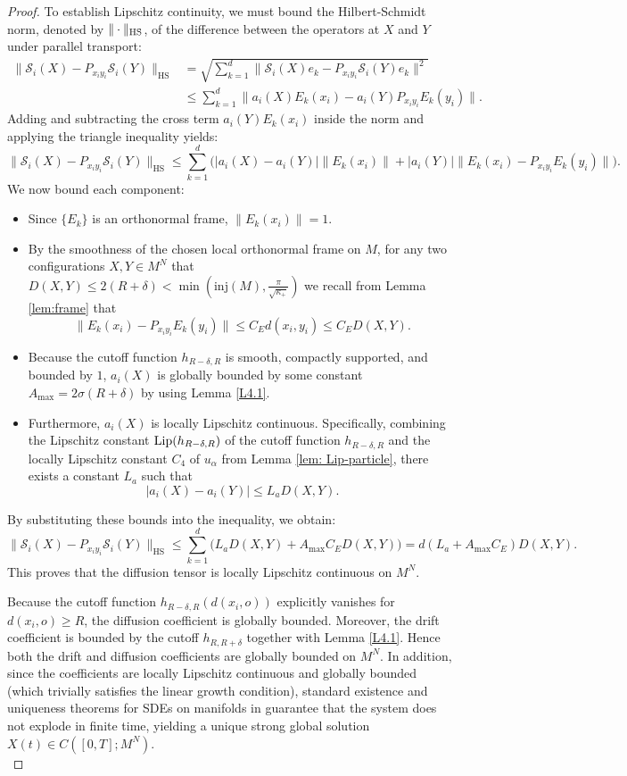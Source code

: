 \documentclass[11pt]{amsart}
\newcommand{\p}{o}%
\newcommand{\dist}{d}%
\begin{document}
\begin{proof}
To establish Lipschitz continuity, we must bound the Hilbert-Schmidt norm, denoted by $\|\cdot\|_{\textup{HS}}$, of the difference between the operators at $X$ and $Y$ under parallel transport:
\begin{align*}
\|\mathcal{S}_i(X) - P_{x_i y_i}\mathcal{S}_i(Y)\|_{\mathrm{HS}} & = \sqrt{ \sum_{k=1}^d \| \mathcal{S}_i(X)e_k - P_{x_i y_i}\mathcal{S}_i(Y)e_k \|^2 } \\
&\leq \sum_{k=1}^d \|a_i(X)E_k(x_i) - a_i(Y)P_{x_i y_i}E_k(y_i)\|.
\end{align*}
Adding and subtracting the cross term $a_i(Y)E_k(x_i)$ inside the norm and applying the triangle inequality yields:
\[
\|\mathcal{S}_i(X) - P_{x_i y_i}\mathcal{S}_i(Y)\|_{\mathrm{HS}} \leq \sum_{k=1}^d \Big( |a_i(X) - a_i(Y)| \|E_k(x_i)\| + |a_i(Y)| \|E_k(x_i) - P_{x_i y_i}E_k(y_i)\| \Big).
\]
We now bound each component:
\begin{itemize}
    \item Since $\{E_k\}$ is an orthonormal frame, $\|E_k(x_i)\| = 1$.
    \item By the smoothness of the chosen local orthonormal frame on $M$, for any two configurations $X,Y\in M^N$ that $D(X, Y) \leq 2(R+\delta)< \min\left(\mathrm{inj}(M), \frac{\pi}{\sqrt{\kappa_+}}\right)$ we recall from Lemma \ref{lem:frame} that  
    \[
    \|E_k(x_i) - P_{x_i y_i}E_k(y_i)\| \leq C_E \dist(x_i, y_i) \leq C_E D(X, Y).
    \]
    \item Because the cutoff function $h_{R-\delta, R}$ is smooth, compactly supported, and bounded by $1$, $a_i(X)$ is globally bounded by some constant $A_{\max} = 2\sigma (R+\delta)$ by using Lemma \ref{L4.1}. 
    \item Furthermore, $a_i(X)$ is locally Lipschitz continuous. Specifically, combining the Lipschitz constant $\textup{Lip}(h_{R-\delta,R})$ of the cutoff function $h_{R-\delta,R}$ and the locally Lipschitz constant $C_4$ of $u_\alpha$ from  Lemma \ref{lem: Lip-particle}, there exists a constant $L_a$ such that
    \[
    |a_i(X) - a_i(Y)| \leq L_a D(X,Y).
    \]
\end{itemize}
By substituting these bounds  into the inequality, we obtain:
\[
\|\mathcal{S}_i(X) - P_{x_i y_i}\mathcal{S}_i(Y)\|_{\mathrm{HS}} \leq \sum_{k=1}^d \Big( L_a D(X,Y) + A_{\max} C_E D(X,Y) \Big) = d(L_a + A_{\max}C_E) D(X,Y).
\]
This proves that the diffusion tensor is locally Lipschitz continuous on $M^N$.

Because the cutoff function \(h_{R-\delta,R}(\dist(x_i,\p))\) explicitly vanishes for \(\dist(x_i,\p)\geq R\), the diffusion coefficient is globally bounded. Moreover, the drift coefficient is bounded by the cutoff \(h_{R,R+\delta}\) together with Lemma \ref{L4.1}.
Hence both the drift and diffusion coefficients are globally bounded on \(M^N\). In addition, since the coefficients are locally Lipschitz continuous and globally bounded (which trivially satisfies the linear growth condition), standard existence and uniqueness theorems for SDEs on manifolds in \cite[Theorem 1.2.9]{hsu2002stochastic} guarantee that the system does not explode in finite time, yielding a unique strong global solution $X(t) \in C ([0, T]; M^N)$.\\


\end{proof}
\end{document}
